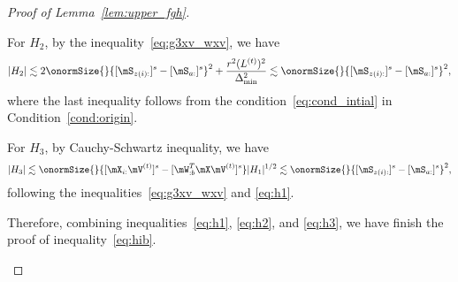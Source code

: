 \documentclass[lettersize,onecolumn,journal]{IEEEtran}
\theoremstyle{definition}
\theoremstyle{definition}
\begin{document}
\begin{proof}[Proof of Lemma~\ref{lem:upper_fgh}]
\begin{enumerate}[wide]
    For $H_2$, by the inequality~\eqref{eq:g3xv_wxv}, we have 
    \begin{equation}\label{eq:h2}
        |H_2| \lesssim 2 \onormSize{}{ [ \mS_{z(i):} ]^s - [ \mS_{a:}]^s }^2 + \frac{r^2 (L^{(t)})^2}{\Delta_{\min}^2} \lesssim \onormSize{}{ [ \mS_{z(i):} ]^s - [ \mS_{a:}]^s }^2,
    \end{equation}
    where the last inequality follows from the condition~\eqref{eq:cond_intial} in Condition~\ref{cond:origin}.
    
      For $H_3$,  by Cauchy-Schwartz inequality, we have 
    \begin{equation}\label{eq:h3}
         |H_3| \lesssim \onormSize{}{[\mX_{i:} \mV^{(t)}]^s  -  [  \mW_{:b}^T \mX \mV^{(t)} ]^s} |H_1|^{1/2} \lesssim \onormSize{}{ [ \mS_{z(i):} ]^s - [ \mS_{a:}]^s }^2,
    \end{equation}
    following the inequalities~\eqref{eq:g3xv_wxv} and \eqref{eq:h1}.
    
  
    
    Therefore, combining inequalities~\eqref{eq:h1}, \eqref{eq:h2}, and \eqref{eq:h3}, we have finish the proof of inequality~\eqref{eq:hib}.

\end{enumerate}


\end{proof}
\end{document}
